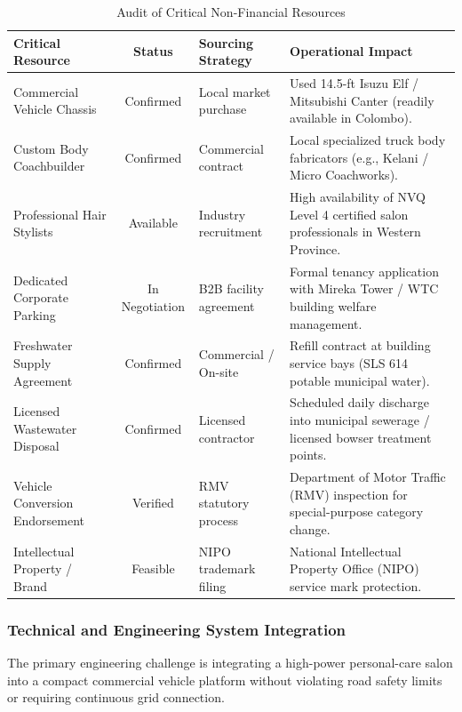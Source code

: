 \begin{table}[htbp]
\centering
\small
\caption{Audit of Critical Non-Financial Resources}
\label{tab:resource_sufficiency}
\begin{tabularx}{\textwidth}{L{0.30\textwidth}cL{0.18\textwidth}Y}
\toprule
\textbf{Critical Resource} & \textbf{Status} & \textbf{Sourcing Strategy} & \textbf{Operational Impact} \\
\midrule
Commercial Vehicle Chassis & Confirmed & Local market purchase & Used 14.5-ft Isuzu Elf / Mitsubishi Canter (readily available in Colombo). \\
Custom Body Coachbuilder & Confirmed & Commercial contract & Local specialized truck body fabricators (e.g., Kelani / Micro Coachworks). \\
Professional Hair Stylists & Available & Industry recruitment & High availability of NVQ Level 4 certified salon professionals in Western Province. \\
Dedicated Corporate Parking & In Negotiation & B2B facility agreement & Formal tenancy application with Mireka Tower / WTC building welfare management. \\
Freshwater Supply Agreement & Confirmed & Commercial / On-site & Refill contract at building service bays (SLS 614 potable municipal water). \\
Licensed Wastewater Disposal & Confirmed & Licensed contractor & Scheduled daily discharge into municipal sewerage / licensed bowser treatment points. \\
Vehicle Conversion Endorsement & Verified & RMV statutory process & Department of Motor Traffic (RMV) inspection for special-purpose category change. \\
Intellectual Property / Brand & Feasible & NIPO trademark filing & National Intellectual Property Office (NIPO) service mark protection. \\
\bottomrule
\end{tabularx}
\end{table}

\subsubsection{Technical and Engineering System Integration}
The primary engineering challenge is integrating a high-power personal-care salon into a compact commercial vehicle platform without violating road safety limits or requiring continuous grid connection.

